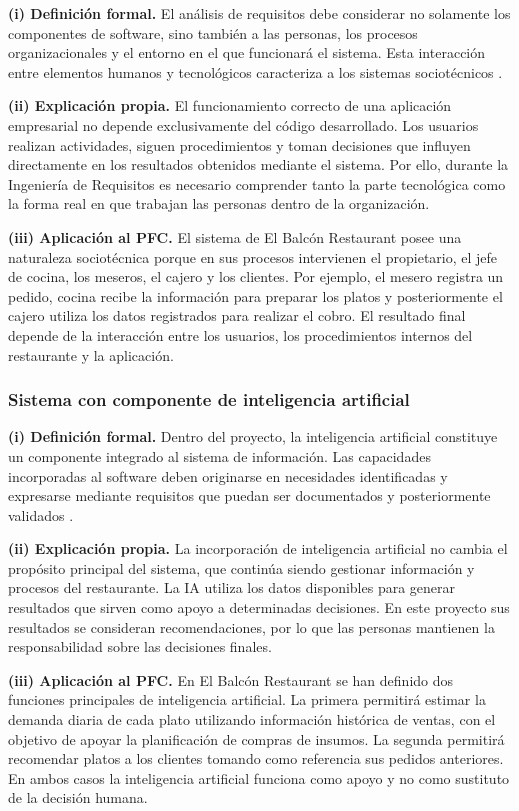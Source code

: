 \textbf{(i) Definición formal.}
El análisis de requisitos debe considerar no solamente los componentes de
software, sino también a las personas, los procesos organizacionales y el
entorno en el que funcionará el sistema. Esta interacción entre elementos
humanos y tecnológicos caracteriza a los sistemas sociotécnicos
\cite{pohl2025,swebok2024}.

\textbf{(ii) Explicación propia.}
El funcionamiento correcto de una aplicación empresarial no depende
exclusivamente del código desarrollado. Los usuarios realizan actividades,
siguen procedimientos y toman decisiones que influyen directamente en los
resultados obtenidos mediante el sistema. Por ello, durante la Ingeniería de
Requisitos es necesario comprender tanto la parte tecnológica como la forma
real en que trabajan las personas dentro de la organización.

\textbf{(iii) Aplicación al PFC.}
El sistema de El Balcón Restaurant posee una naturaleza sociotécnica porque
en sus procesos intervienen el propietario, el jefe de cocina, los meseros,
el cajero y los clientes. Por ejemplo, el mesero registra un pedido, cocina
recibe la información para preparar los platos y posteriormente el cajero
utiliza los datos registrados para realizar el cobro. El resultado final
depende de la interacción entre los usuarios, los procedimientos internos
del restaurante y la aplicación.

\subsubsection{Sistema con componente de inteligencia artificial}

\textbf{(i) Definición formal.}
Dentro del proyecto, la inteligencia artificial constituye un componente
integrado al sistema de información. Las capacidades incorporadas al software
deben originarse en necesidades identificadas y expresarse mediante requisitos
que puedan ser documentados y posteriormente validados
\cite{ieee29148,pohl2025}.

\textbf{(ii) Explicación propia.}
La incorporación de inteligencia artificial no cambia el propósito principal
del sistema, que continúa siendo gestionar información y procesos del
restaurante. La IA utiliza los datos disponibles para generar resultados que
sirven como apoyo a determinadas decisiones. En este proyecto sus resultados
se consideran recomendaciones, por lo que las personas mantienen la
responsabilidad sobre las decisiones finales.

\textbf{(iii) Aplicación al PFC.}
En El Balcón Restaurant se han definido dos funciones principales de
inteligencia artificial. La primera permitirá estimar la demanda diaria de
cada plato utilizando información histórica de ventas, con el objetivo de
apoyar la planificación de compras de insumos. La segunda permitirá recomendar
platos a los clientes tomando como referencia sus pedidos anteriores. En ambos
casos la inteligencia artificial funciona como apoyo y no como sustituto de
la decisión humana.

